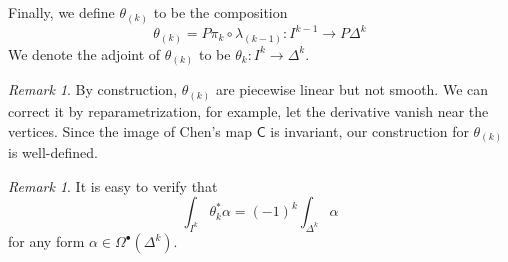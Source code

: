 \documentclass[12pt]{amsart}
\theoremstyle{definition}
\theoremstyle{remark}
\newtheorem{rem}[thm]{Remark}
\numberwithin{equation}{section}
\newcommand{\1}{{\mathbb{1}}}
\newcommand{\bt}{\bullet}
\begin{document}
Finally, we define $\theta_{(k)}$ to be the composition
\begin{equation*}
    \theta_{(k)} = P\pi_k \circ \lambda _{(k-1)}: I^{k-1} \to P\Delta^k
\end{equation*}
We denote the adjoint of $\theta_{(k)}$ to be $\theta_{k}: I^k \to \Delta^k$.
\begin{rem}
    By construction, $\theta_{(k)}$ are piecewise linear but not smooth. We can correct it by reparametrization, for example, let the derivative vanish near the vertices. Since the image of Chen's map $\mathsf{C}$ is invariant, our construction for $\theta_{(k)}$ is well-defined.
\end{rem}
\begin{rem}
    It is easy to verify that 
    \begin{equation*}
        \int_{I^k} \theta^*_k \alpha = (-1)^k\int_{\Delta^k} \alpha
    \end{equation*}
    for any form $\alpha\in \Omega^{\bt}(\Delta^k)$.
\end{rem}
\end{document}
